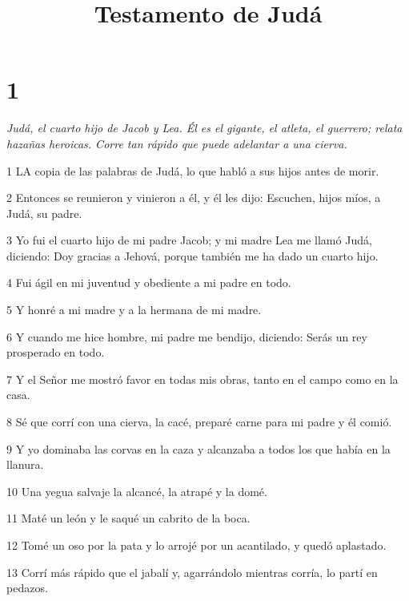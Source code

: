 

\title{Testamento de Judá}

\chapter{1}

\par \textit{Judá, el cuarto hijo de Jacob y Lea. Él es el gigante, el atleta, el guerrero; relata hazañas heroicas. Corre tan rápido que puede adelantar a una cierva.}

\par 1 LA copia de las palabras de Judá, lo que habló a sus hijos antes de morir.

\par 2 Entonces se reunieron y vinieron a él, y él les dijo: Escuchen, hijos míos, a Judá, su padre.

\par 3 Yo fui el cuarto hijo de mi padre Jacob; y mi madre Lea me llamó Judá, diciendo: Doy gracias a Jehová, porque también me ha dado un cuarto hijo.

\par 4 Fui ágil en mi juventud y obediente a mi padre en todo.

\par 5 Y honré a mi madre y a la hermana de mi madre.

\par 6 Y cuando me hice hombre, mi padre me bendijo, diciendo: Serás un rey prosperado en todo.

\par 7 Y el Señor me mostró favor en todas mis obras, tanto en el campo como en la casa.

\par 8 Sé que corrí con una cierva, la cacé, preparé carne para mi padre y él comió.

\par 9 Y yo dominaba las corvas en la caza y alcanzaba a todos los que había en la llanura.

\par 10 Una yegua salvaje la alcancé, la atrapé y la domé.

\par 11 Maté un león y le saqué un cabrito de la boca.

\par 12 Tomé un oso por la pata y lo arrojé por un acantilado, y quedó aplastado.

\par 13 Corrí más rápido que el jabalí y, agarrándolo mientras corría, lo partí en pedazos.

